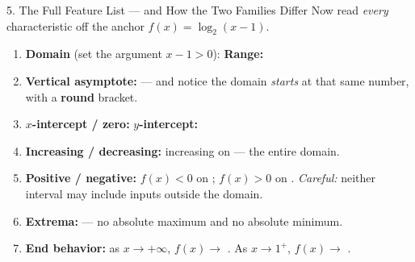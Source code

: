\documentclass[10pt]{article}
\newcommand{\lgrid}[4]{%
  \draw[step=1, linegray!40, very thin] (#1,#3) grid (#2,#4);
  \draw[->, semithick, charcoal] (#1,0)--(#2,0) node[below right, font=\scriptsize]{$x$};
  \draw[->, semithick, charcoal] (0,#3)--(0,#4) node[left, font=\scriptsize]{$y$};}
\newcommand{\logcurve}[5]{\draw[very thick, forest, domain=#4:#5, samples=120, smooth]
  plot ({pow(#1,\x-(#3))+(#2)},{\x});}
\begin{document}
\begin{notesbox}{5. The Full Feature List --- and How the Two Families Differ}
Now read \emph{every} characteristic off the anchor $f(x)=\log_2(x-1)$.
\begin{center}
\end{center}
\begin{enumerate}[leftmargin=1.7em, itemsep=3pt]
  \item \textbf{Domain} (set the argument $x-1>0$):  \quad \textbf{Range:}
        \ans{$(-\infty,\infty)$}
  \item \textbf{Vertical asymptote:}  --- and notice the domain \emph{starts} at that
        same number, with a \textbf{round} bracket.
  \item \textbf{$x$-intercept / zero:}  \quad \textbf{$y$-intercept:} 
  \item \textbf{Increasing / decreasing:} increasing on  --- the entire domain.
  \item \textbf{Positive / negative:} $f(x)<0$ on ; \quad $f(x)>0$ on
        . \emph{Careful:} neither interval may include inputs outside the domain.
  \item \textbf{Extrema:}  --- no absolute maximum and no absolute minimum.
  \item \textbf{End behavior:} as $x\to+\infty$, $f(x)\to$ \ans{$+\infty$}. \; As $x\to 1^{+}$,
        $f(x)\to$ \ans{$-\infty$}.
\end{enumerate}


\end{notesbox}
\end{document}
